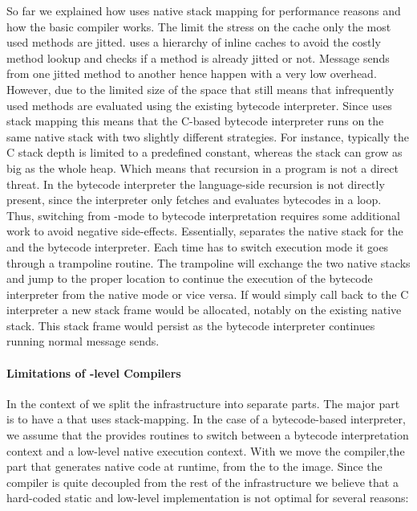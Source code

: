 \noindent So far we explained how \Cog uses native stack mapping for performance reasons and how the basic \JIT compiler works.
The limit the stress on the \CPU cache only the most used methods are jitted.
\Cog uses a hierarchy of inline caches to avoid the costly method lookup and checks if a method is already jitted or not.
Message sends from one jitted method to another hence happen with a very low overhead.
However, due to the limited size of the \JIT space that still means that infrequently used methods are evaluated using the existing bytecode interpreter.
Since \Cog uses stack mapping this means that the C-based bytecode interpreter runs on the same native stack with two slightly different strategies.
For instance, typically the C stack depth is limited to a predefined constant, whereas the \PH stack can grow as big as the whole heap.
Which means that recursion in a \PH program is not a direct threat.
In the bytecode interpreter the language-side recursion is not directly present, since the interpreter only fetches and evaluates bytecodes in a loop.
Thus, switching from \JIT-mode to bytecode interpretation requires some additional work to avoid negative side-effects.
Essentially, \Cog separates the native stack for the \JIT and the bytecode interpreter.
Each time \Cog has to switch execution mode it goes through a trampoline routine.
The trampoline will exchange the two native stacks and jump to the proper location to continue the execution of the bytecode interpreter from the native \JIT mode or vice versa.
If \Cog would simply call back to the C interpreter a new stack frame would be allocated, notably on the existing native \JIT stack.
This stack frame would persist as the bytecode interpreter continues running normal \PH message sends.

\paragraph{Limitations of \VM-level \JIT Compilers}
In the context of \NBJ we split the \JIT infrastructure into separate parts.
The major part is to have a \VM that uses stack-mapping.
In the case of a bytecode-based interpreter, we assume that the \VM provides routines to switch between a bytecode interpretation context and a low-level native execution context.
With \NBJ we move the \JIT compiler,the part that generates native code at runtime, from the \VM to the image.%
 Since the \JIT compiler is quite decoupled from the rest of the \JIT infrastructure we believe that a hard-coded static and low-level implementation is not optimal for several reasons:


